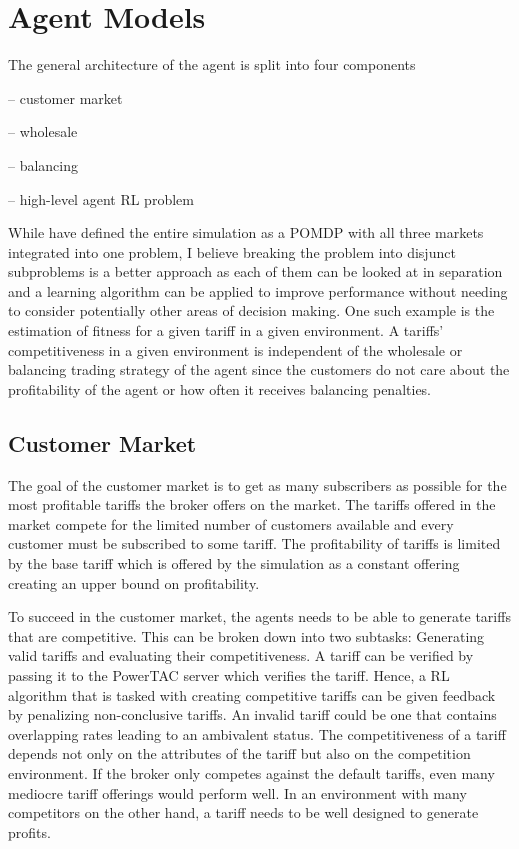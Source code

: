 \section{Agent Models}

The general architecture of the agent is split into four components

-- customer market

-- wholesale 

-- balancing 

-- high-level agent \ac {RL} problem

While \citeauthor{tactexurieli2016mdp} have defined the entire simulation as a \ac {POMDP} with all three markets
integrated into one problem, I believe breaking the problem into disjunct subproblems is a better approach as each of
them can be looked at in separation and a learning algorithm can be applied to improve performance without needing to
consider potentially other areas of decision making. One such example is the estimation of fitness for a given tariff in
a given environment. A tariffs' competitiveness in a given environment is independent of the wholesale or balancing
trading strategy of the agent since the customers do not care about the profitability of the agent or how often it
receives balancing penalties.

\subsection{Customer Market}

The goal of the customer market is to get as many subscribers as possible for the most profitable tariffs the broker
offers on the market. The tariffs offered in the market compete for the limited number of customers available and every
customer must be subscribed to some tariff. The profitability of tariffs is limited by the base tariff which is offered
by the simulation as a constant offering creating an upper bound on profitability. 

To succeed in the customer market, the agents needs to be able to generate tariffs that are competitive. This can be
broken down into two subtasks: Generating valid tariffs and evaluating their competitiveness. A tariff can be
verified by passing it to the \ac {PowerTAC} server which verifies the tariff. Hence, a \ac {RL} algorithm that is
tasked with creating competitive tariffs can be given feedback by penalizing non-conclusive tariffs. An invalid tariff
could be one that contains overlapping rates leading to an ambivalent status. The competitiveness of a tariff depends
not only on the attributes of the tariff but also on the competition environment. If the broker only competes against
the default tariffs, even many mediocre tariff offerings would perform well. In an environment with many competitors on
the other hand, a tariff needs to be well designed to generate profits. 

